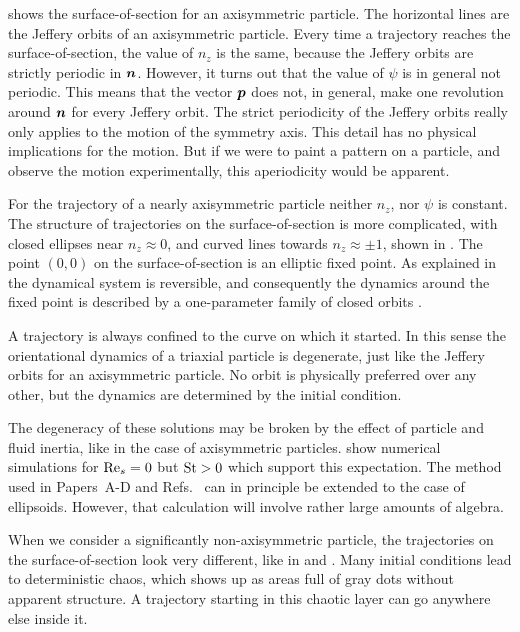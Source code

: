 \documentclass[thesis.tex]{subfiles}
\begin{document}
 shows the surface-of-section for an axisymmetric particle. The horizontal lines are the Jeffery orbits of an axisymmetric particle. Every time a trajectory reaches the surface-of-section, the value of $n_z$ is the same, because the Jeffery orbits are strictly periodic in $\mbox{\boldmath$n$}$. However, it turns out that the value of $\psi$ is in general not periodic. This means that the vector $\mbox{\boldmath$p$}$ does not, in general, make one revolution around $\mbox{\boldmath$n$}$ for every Jeffery orbit. The strict periodicity of the Jeffery orbits really only applies to the motion of the symmetry axis. This detail has no physical implications for the motion. But if we were to paint a pattern on a particle, and observe the motion experimentally, this aperiodicity would be apparent.

For the trajectory of a nearly axisymmetric particle neither $n_z$, nor $\psi$ is constant. The structure of trajectories on the surface-of-section is more complicated, with closed ellipses near $n_z\approx 0$, and curved lines towards $n_z\approx\pm 1$, shown in .
The point $(0,0)$ on the surface-of-section is an elliptic fixed point. As explained in  the dynamical system  is reversible, and consequently the dynamics around the fixed point is described by a one-parameter family of closed orbits \cite{lamb1998}.

A trajectory is always confined to the curve on which it started. In this sense the orientational dynamics of a triaxial particle is degenerate, just like the Jeffery orbits for an axisymmetric particle. No orbit is physically preferred over any other, but the dynamics are determined by the initial condition.

The degeneracy of these solutions may be broken by the effect of particle and fluid inertia, like in the case of axisymmetric particles. \citet{lundell2011} show numerical simulations for $\textrm{Re}_s=0$ but $\mbox{St}>0$ which support this expectation. The method used in Papers~A-D and Refs.~\cite{subramanian2005,subramanian2006} can in principle be extended to the case of ellipsoids. However, that calculation will involve rather large amounts of algebra.

When we consider a significantly non-axisymmetric particle, the trajectories on the surface-of-section look very different, like in  and . Many initial conditions lead to deterministic chaos, which shows up as areas full of gray dots without apparent structure. A trajectory starting in this chaotic layer can go anywhere else inside it. 
\end{document}
